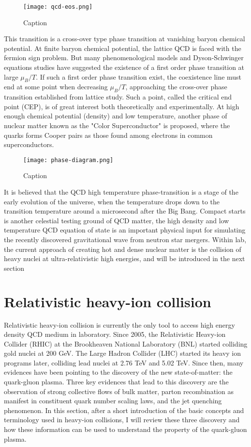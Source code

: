\begin{figure}
    \centering
    \texttt{[image: qcd-eos.png]}
    \caption{Caption}
    \label{fig:qcd_eos}
\end{figure}

This transition is a cross-over type phase transition at vanishing baryon chemical potential.
At finite baryon chemical potential, the lattice QCD is faced with the fermion sign problem. But many phenomenological models and Dyson-Schwinger equations studies have suggested the existence of a first order phase transition at large $\mu_B/T$.
If such a first order phase transition exist, the coexistence line must end at some point when decreasing $\mu_B/T$, approaching the cross-over phase transition established from lattice study.
Such a point, called the critical end point (CEP), is of great interest both theoretically and experimentally.
At high enough chemical potential (density) and low temperature, another phase of nuclear matter known as the "Color Superconductor" is proposed, where the quarks forms Cooper pairs as those found among electrons in common superconductors.

\begin{figure}
    \centering
    \texttt{[image: phase-diagram.png]}
    \caption{Caption}
    \label{fig:phase-diagram}
\end{figure}

It is believed that the QCD high temperature phase-transition is a stage of the early evolution of the universe, when the temperature drops down to the transition temperature around a microsecond after the Big Bang.
Compact starts is another celestial testing ground of QCD matter, the high density and low temperature QCD equation of state is an important physical input for simulating the recently discovered gravitational wave from neutron star mergers.
Within lab, the current approach of creating hot and dense nuclear matter is the collision of heavy nuclei at ultra-relativistic high energies, and will be introduced in the next section



\section{Relativistic heavy-ion collision}
Relativistic heavy-ion collision is currently the only tool to access high energy density QCD medium in laboratory.
Since 2005, the Relativistic Heavy-ion Collider (RHIC) at the Brookheaven National Laboratory (BNL) started colliding gold nuclei at 200 GeV. 
The Large Hadron Collider (LHC) started its heavy ion programs later, colliding lead nuclei at 2.76 TeV and 5.02 TeV.
Since then, many evidences have been pointing to the discovery of the new state-of-matter: the quark-gluon plasma.
Three key evidences that lead to this discovery are the observation of strong collective flows of bulk matter, parton recombination as manifest in constituent quark number scaling laws, and the jet quenching phenomenon. 
In this section, after a short introduction of the basic concepts and terminology used in heavy-ion collisions, I will review these three discovery and how these information can be used to understand the property of the quark-gluon plasma.

